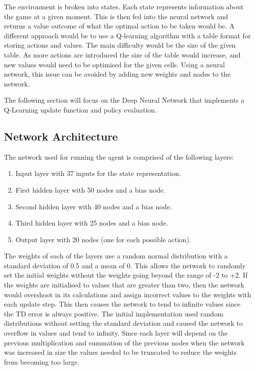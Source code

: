 The environment is broken into states. Each state represents information about
the game at a given moment. This is then fed into the neural network and
returns a value outcome of what the optimal action to be taken would be. A
different approach would be to use a Q-learning algorithm with a table format
for storing actions and values. The main difficulty would be the size of the
given table. As more actions are introduced the size of the table would
increase, and new values would need to be optimised for the given cells. Using a
neural network, this issue can be avoided by adding new weights and nodes to the
network.

The following section will focus on the Deep Neural Network that implements a
Q-Learning update function and policy evaluation.

\subsection{Network Architecture}

The network used for running the agent is comprised of the following layers:

\begin{enumerate}
    \item Input layer with 37 inputs for the state representation.
    \item First hidden layer with 50 nodes and a bias node.
    \item Second hidden layer with 40 nodes and a bias node.
    \item Third hidden layer with 25 nodes and a bias node.
    \item Output layer with 20 nodes (one for each possible action).
\end{enumerate}

The weights of each of the layers use a random normal distribution with a
standard deviation of 0.5 and a mean of 0. This allows the network to randomly
set the initial weights without the weights going beyond the range of -2 to +2.
If the weights are initialised to values that are greater than two, then the
network would overshoot in its calculations and assign incorrect values to the
weights with each update step. This then causes the network to tend to infinite
values since the TD error is always positive. The initial implementation used
random distributions without setting the standard deviation and caused the
network to overflow in values and tend to infinity. Since each layer will depend
on the previous multiplication and summation of the previous nodes when the
network was increased in size the values needed to be truncated to reduce the
weights from becoming too large.

